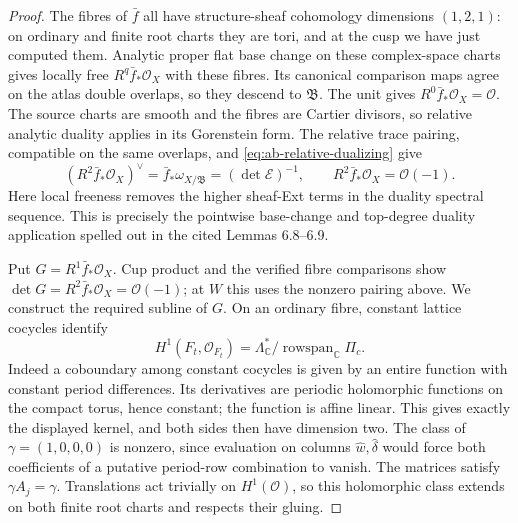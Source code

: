 \begin{proof}
The fibres of $\bar f$ all have structure-sheaf cohomology dimensions
$(1,2,1)$: on ordinary and finite root charts they are tori, and at
the cusp we have just computed them. Analytic proper flat base change
on these complex-space charts gives locally free $R^q\bar f_*\mathcal O_X$
with these fibres. Its canonical comparison maps agree on the atlas
double overlaps, so they descend to $\mathfrak B$. The unit gives
$R^0\bar f_*\mathcal O_X=\mathcal O$.
The source charts are smooth and the fibres are Cartier divisors,
so relative analytic duality applies in its Gorenstein form. The
relative trace pairing, compatible on the same overlaps, and
\eqref{eq:ab-relative-dualizing} give
\[
 (R^2\bar f_*\mathcal O_X)^\vee
 =\bar f_*\omega_{X/\mathfrak B}
 =(\det\mathcal E)^{-1},
 \qquad R^2\bar f_*\mathcal O_X=\mathcal O(-1).
\]
Here local freeness removes the higher sheaf-Ext terms in the duality
spectral sequence. This is precisely the pointwise base-change and
top-degree duality application spelled out in the cited Lemmas 6.8--6.9.

Put $G=R^1\bar f_*\mathcal O_X$. Cup product and the verified fibre
comparisons show $\det G=R^2\bar f_*\mathcal O_X=\mathcal O(-1)$;
at $W$ this uses the nonzero pairing above.
We construct the required subline of $G$. On an ordinary fibre,
constant lattice cocycles identify
\[
 H^1(F_t,\mathcal O_{F_t})
 =\Lambda_{\mathbb C}^*/\operatorname{rowspan}_{\mathbb C}\Pi_c.
\]
Indeed a coboundary among constant cocycles is given by an entire
function with constant period differences. Its derivatives are
periodic holomorphic functions on the compact torus, hence constant;
the function is affine linear. This gives exactly the displayed
kernel, and both sides then have dimension two. The class of
$\gamma=(1,0,0,0)$ is nonzero, since evaluation on columns
$\widehat w,\widehat\delta$ would force both coefficients of a
putative period-row combination to vanish.
The matrices satisfy $\gamma A_j=\gamma$. Translations act trivially
on $H^1(\mathcal O)$, so this holomorphic class extends on both finite
root charts and respects their gluing.


\end{proof}
